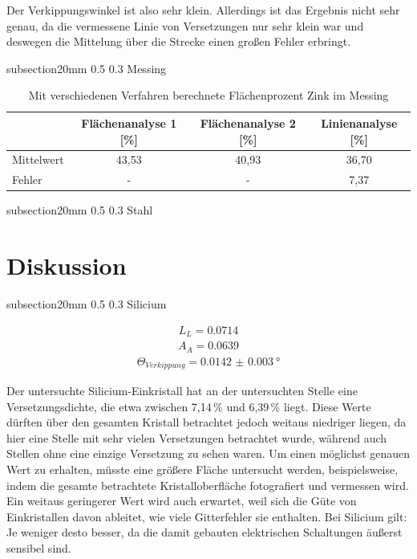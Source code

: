 \documentclass[german, %
parskip=full, %
bibliography=totoc, %
]{scrartcl}
\makeatletter
\renewcommand\subsection{\@startsection 
   {subsection}{2}{0mm}%
   {0.5\baselineskip}%
   {0.3\baselineskip}%
   {\bfseries\sffamily\large}%
   }
\makeatother
\begin{document}
Der Verkippungswinkel ist also sehr klein. Allerdings ist das Ergebnis nicht sehr genau, da die vermessene Linie von Versetzungen nur sehr klein war und deswegen die Mittelung über die Strecke einen großen Fehler erbringt. 

\subsection{Messing}

\begin{table}[ht]
\centering
\begin{tabular}[h]{l|c|c|c}
& Flächenanalyse 1 [\%] & Flächenanalyse 2 [\%] & Linienanalyse [\%] \\ \hline
Mittelwert & 43,53 & 40,93 & 36,70 \\ \hline
Fehler & - & - & 7,37
\end{tabular}
\caption{Mit verschiedenen Verfahren berechnete Flächenprozent Zink im Messing}
\label{tab:prozentzink}
\end{table}

\subsection{Stahl}



\section{Diskussion}

\subsection{Silicium}

\begin{align*}
L_L = 0.0714
\end{align*}
\begin{align*}
A_A = 0.0639
\end{align*}
\begin{align*}
\Theta_{Verkippung} = \SI[separate-uncertainty = true]{0.0142(30)}{\degree}
\end{align*}

Der untersuchte Silicium-Einkristall hat an der untersuchten Stelle eine Versetzungsdichte, die etwa zwischen 7,14\,\% und 6,39\,\% liegt. Diese Werte dürften über den gesamten Kristall betrachtet jedoch weitaus niedriger liegen, da hier eine Stelle mit sehr vielen Versetzungen betrachtet wurde, während auch Stellen ohne eine einzige Versetzung zu sehen waren. Um einen möglichst genauen Wert zu erhalten, müsste eine größere Fläche untersucht werden, beispielsweise, indem die gesamte betrachtete Kristalloberfläche fotografiert und vermessen wird. Ein weitaus geringerer Wert wird auch erwartet, weil sich die Güte von Einkristallen davon ableitet, wie viele Gitterfehler sie enthalten. Bei Silicium gilt: Je weniger desto besser, da die damit gebauten elektrischen Schaltungen äußerst sensibel sind.
\end{document}

